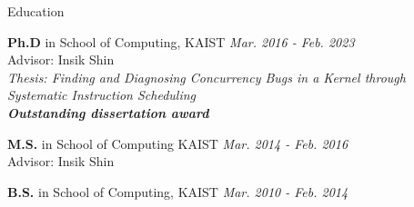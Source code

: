 
\begin{rSection}{Education}

\textbf{Ph.D} in School of Computing, KAIST \hfill {\em Mar. 2016 - Feb. 2023} \\
Advisor: Insik Shin \\
\textit{Thesis: Finding and Diagnosing Concurrency Bugs in a Kernel through Systematic Instruction Scheduling} \\
\textbf{\textit{Outstanding  dissertation award}}

\textbf{M.S.} in School of Computing KAIST \hfill {\em Mar. 2014 - Feb. 2016} \\
Advisor: Insik Shin

\textbf{B.S.} in School of Computing, KAIST \hfill {\em Mar. 2010 - Feb. 2014}

\end{rSection}

